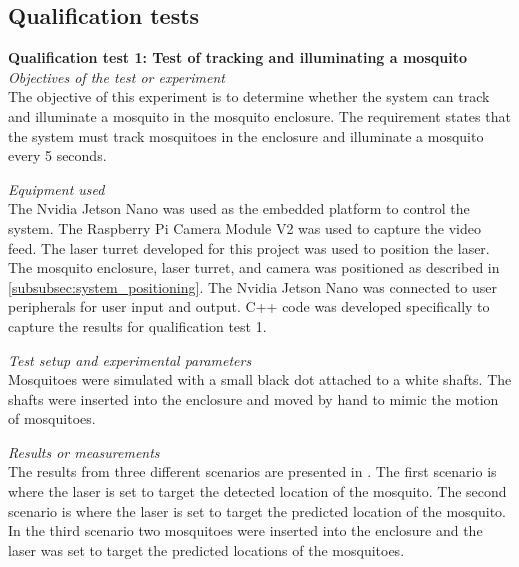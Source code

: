 \subsection{Qualification tests}
\textbf{Qualification test 1: Test of tracking and illuminating a mosquito}\\

\textit{Objectives of the test or experiment}\\
The objective of this experiment is to determine whether the system can track and illuminate a mosquito in the mosquito enclosure. The requirement states that the system must track mosquitoes in the enclosure and illuminate a mosquito every 5 seconds.

\textit{Equipment used}\\
The Nvidia Jetson Nano was used as the embedded platform to control the system. The Raspberry Pi Camera Module V2 was used to capture the video feed. The laser turret developed for this project was used to position the laser. The mosquito enclosure, laser turret, and camera was positioned as described in \autoref{subsubsec:system_positioning}. The Nvidia Jetson Nano was connected to user peripherals for user input and output. C++ code was developed specifically to capture the results for qualification test 1.

\textit{Test setup and experimental parameters}\\
Mosquitoes were simulated with a small black dot attached to a white shafts. The shafts were inserted into the enclosure and moved by hand to mimic the motion of mosquitoes.

\textit{Results or measurements}\\
The results from three different scenarios are presented in . The first scenario is where the laser is set to target the detected location of the mosquito. The second scenario is where the laser is set to target the predicted location of the mosquito. In the third scenario two mosquitoes were inserted into the enclosure and the laser was set to target the predicted locations of the mosquitoes.


